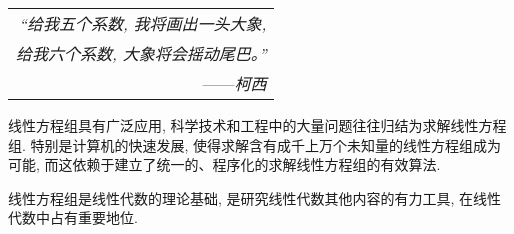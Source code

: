 \begin{flushright}
    \begin{tabular}{r||}
        \textit{“给我五个系数, 我将画出一头大象, }\\
        \textit{给我六个系数, 大象将会摇动尾巴。”}\\
        ——\textit{柯西}
    \end{tabular}
\end{flushright}

线性方程组具有广泛应用, 科学技术和工程中的大量问题往往归结为求解线性方程组. 特别是计算机的快速发展, 使得求解含有成千上万个未知量的线性方程组成为可能, 
而这依赖于建立了统一的、程序化的求解线性方程组的有效算法. 

线性方程组是线性代数的理论基础, 是研究线性代数其他内容的有力工具, 在线性代数中占有重要地位.